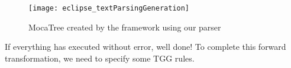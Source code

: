 \vspace{0.5cm}

\begin{figure}[!htbp]
\begin{center}
 \texttt{[image: eclipse\_textParsingGeneration]}
  \caption{MocaTree created by the framework using our parser}
  \label{eclipse:treeResult}
\end{center}
\end{figure}

\vspace{0.5cm}

If everything has executed without error, well done! To complete this forward transformation, we need to specify some TGG rules.
